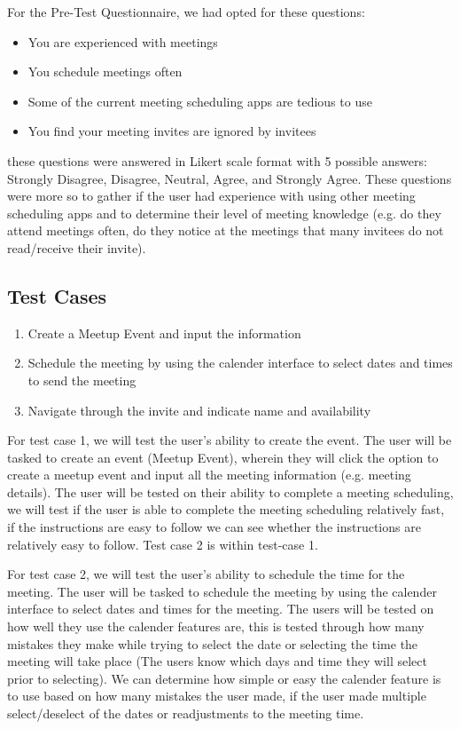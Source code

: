 \documentclass{sigchi}
\begin{document}
For the Pre-Test Questionnaire, we had opted for these questions:

\begin{itemize}
	\item You are experienced with meetings
	\item You schedule meetings often
	\item Some of the current meeting scheduling apps are tedious to use
	\item You find your meeting invites are ignored by invitees	
\end{itemize}

these questions were answered in Likert scale format with 5 possible answers: Strongly Disagree, Disagree, Neutral, Agree, and Strongly Agree. These questions were more so to gather if the user had experience with using other meeting scheduling apps and to determine their level of meeting knowledge (e.g. do they attend meetings often, do they notice at the meetings that many invitees do not read/receive their invite).

\subsection{Test Cases}
\begin{enumerate}
\item Create a Meetup Event and input the information
\item Schedule the meeting by using the calender interface to select dates and times to send the meeting
\item Navigate through the invite and indicate name and availability
\end{enumerate}

For test case 1, we will test the user's ability to create the event. The user will be tasked to create an event (Meetup Event), wherein they will click the option to create a meetup event and input all the meeting information (e.g. meeting details). The user will be tested on their ability to complete a meeting scheduling, we will test if the user is able to complete the meeting scheduling relatively fast, if the instructions are easy to follow we can see whether the instructions are relatively easy to follow. Test case 2 is within test-case 1.

For test case 2, we will test the user's ability to schedule the time for the meeting. The user will be tasked to schedule the meeting by using the calender interface to select dates and times for the meeting. The users will be tested on how well they use the calender features are, this is tested through how many mistakes they make while trying to select the date or selecting the time the meeting will take place (The users know which days and time they will select prior to selecting). We can determine how simple or easy the calender feature is to use based on how many mistakes the user made, if the user made multiple select/deselect of the dates or readjustments to the meeting time.
\end{document}
